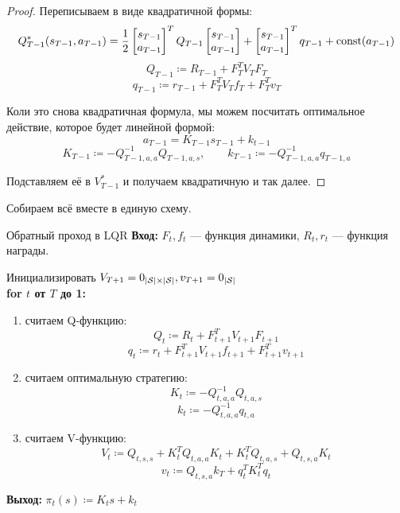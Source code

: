 \begin{theorem}
\begin{proof}
Переписываем в виде квадратичной формы:
$$Q^*_{T-1}(s_{T-1}, a_{T-1}) = \frac{1}{2} \begin{bmatrix} s_{T-1} \\ a_{T-1} \end{bmatrix}^T Q_{T-1} \begin{bmatrix} s_{T-1} \\ a_{T-1} \end{bmatrix} + \begin{bmatrix} s_{T-1} \\ a_{T-1} \end{bmatrix}^T q_{T-1} + \operatorname{const}(a_{T-1})$$
$$Q_{T-1} \coloneqq R_{T-1} + F_T^TV_TF_T$$
$$q_{T-1} \coloneqq r_{T-1} + F_T^T V_T f_T + F_T^T v_T$$

Коли это снова квадратичная формула, мы можем посчитать оптимальное действие, которое будет линейной формой:
$$a_{T-1} = K_{T-1}s_{T-1} + k_{t-1}$$
$$K_{T-1} \coloneqq -Q_{T-1, a, a}^{-1} Q_{T-1, a, s}, \qquad k_{T-1} \coloneqq -Q^{-1}_{T-1, a, a} q_{T-1,a}$$

Подставляем её в $V^*_{T-1}$ и получаем квадратичную и так далее.
\end{proof}
\end{theorem}

Собираем всё вместе в единую схему.

\begin{algorithm}{Обратный проход в LQR}
\textbf{Вход:} $F_t, f_t$ --- функция динамики, $R_t, r_t$ --- функция награды.

\vspace{0.3cm}
Инициализировать $V_{T+1} = 0_{|\mathcal{S}| \times |\mathcal{S}|}, v_{T+1} = 0_{|\mathcal{S}|}$ \\
\textbf{for $t$ от $T$ до 1:}
\begin{enumerate}
    \item считаем Q-функцию:
    $$Q_t \coloneqq R_t + F_{t+1}^TV_{t+1}F_{t+1}$$
    $$q_t \coloneqq r_t + F_{t+1}^TV_{t+1}f_{t+1} + F_{t+1}^T v_{t+1}$$
    \item считаем оптимальную стратегию:
    $$K_t \coloneqq -Q_{t, a, a}^{-1} Q_{t, a, s}$$
    $$k_t \coloneqq -Q^{-1}_{t, a, a} q_{t,a}$$
    \item считаем V-функцию:
    $$V_t \coloneqq Q_{t, s, s} + K_t^TQ_{t, a, a}K_t + K_t^TQ_{t, a, s} + Q_{t, s, a}K_t$$
    $$v_t \coloneqq Q_{t, s, a}k_T + q_t^T K_t^T q_t$$
\end{enumerate}

\vspace{0.3cm}
\textbf{Выход:} $\pi_t(s) \coloneqq K_ts + k_t$
\end{algorithm}


